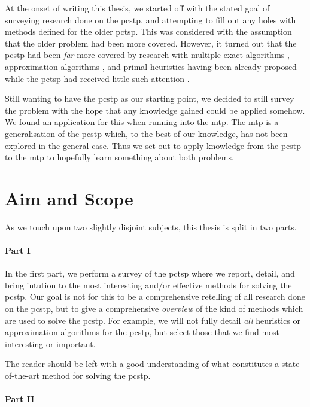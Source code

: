 At the onset of writing this thesis, we started off with the stated
goal of surveying research done
on the \gls{pcstp}, and attempting to fill out any holes with methods defined for the older
\gls{pctsp}. This was considered with the assumption that the older problem had
been more covered.
However, it turned out that the \gls{pcstp} had been \textit{far} more covered
by research with multiple exact algorithms
\citep{ljubic2005solving, leitner2016dual, gamrath2017scip},
approximation algorithms \citep{Bienstock1993,goemans1995general,Johnson:2000:PCS:338219.338637},
and primal heuristics \citep{canuto2001local,fu2014knowledge,akhmedov2016divide}
having been already proposed while the \gls{pctsp} had received little such attention
\citep{archetti2014chapter}.

Still wanting to have the \gls{pcstp} as our starting point, we decided to still survey the
problem with the hope that any knowledge gained could be applied somehow. We found an application
for this when running into the \gls{mtp}. The \gls{mtp} is a generalisation of the \gls{pcstp}
which, to the best of our knowledge, has not been explored in the general case. Thus we set out
to apply knowledge from the \gls{pcstp} to the \gls{mtp} to hopefully learn something about
both problems.
\section{Aim and Scope}
As we touch upon two slightly disjoint subjects, this thesis is split
in two parts.
\paragraph{Part I}

In the first part, we perform a
survey of the \acrlong{pctsp} where we report, detail, and bring intution to the most interesting
and/or effective methods for solving the \gls{pcstp}.
Our goal is not for this to be a comprehensive retelling
of all research done on the \gls{pcstp}, but to give a comprehensive \textit{overview} of
the kind of methods which are used to solve the \gls{pcstp}.
For example, we will not fully detail \textit{all}
heuristics or approximation algorithms for the \gls{pcstp},
but select those that we find most interesting or important.

The reader should be left with a good understanding of
what constitutes a state-of-the-art method for solving the \gls{pcstp}.

\paragraph{Part II}

